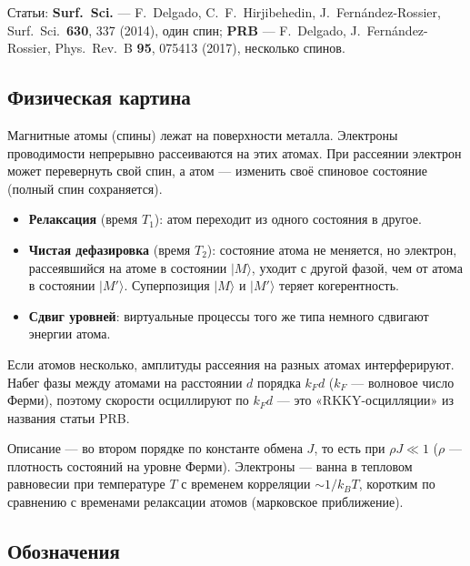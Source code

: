 Статьи: \textbf{Surf.\ Sci.} --- F.~Delgado, C.~F.~Hirjibehedin,
J.~Fern\'andez-Rossier, Surf.\ Sci.\ \textbf{630}, 337 (2014), один спин;
\textbf{PRB} --- F.~Delgado, J.~Fern\'andez-Rossier, Phys.\ Rev.\ B \textbf{95},
075413 (2017), несколько спинов.

\subsection{Физическая картина}
\label{sec:kd_picture}

Магнитные атомы (спины) лежат на поверхности металла. Электроны проводимости
непрерывно рассеиваются на этих атомах. При рассеянии электрон может
перевернуть свой спин, а атом --- изменить своё спиновое состояние (полный
спин сохраняется).
\begin{itemize}
\item \textbf{Релаксация} (время $T_1$): атом переходит из одного состояния в
  другое.
\item \textbf{Чистая дефазировка} (время $T_2$): состояние атома не меняется, но
  электрон, рассеявшийся на атоме в состоянии $|M\rangle$, уходит с другой фазой,
  чем от атома в состоянии $|M'\rangle$. Суперпозиция $|M\rangle$ и $|M'\rangle$
  теряет когерентность.
\item \textbf{Сдвиг уровней}: виртуальные процессы того же типа немного сдвигают
  энергии атома.
\end{itemize}
Если атомов несколько, амплитуды рассеяния на разных атомах интерферируют.
Набег фазы между атомами на расстоянии $d$ порядка $k_Fd$ ($k_F$ --- волновое
число Ферми), поэтому скорости осциллируют по $k_Fd$ --- это «RKKY-осцилляции»
из названия статьи PRB.

Описание --- во втором порядке по константе обмена $J$, то есть при $\rho J\ll1$
($\rho$ --- плотность состояний на уровне Ферми). Электроны --- ванна в тепловом
равновесии при температуре $T$ с временем корреляции $\sim1/k_BT$, коротким
по сравнению с временами релаксации атомов (марковское приближение).

\subsection{Обозначения}
\label{sec:kd_notation}

